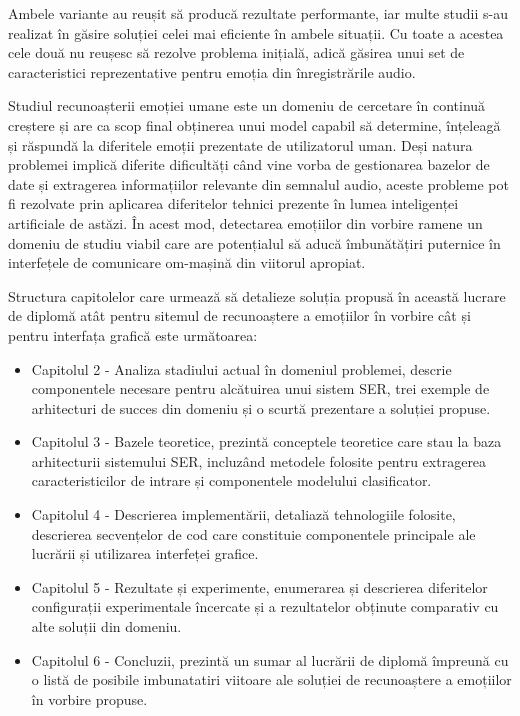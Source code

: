 \documentclass[a4paper,12pt]{book}
\begin{document}
					Ambele variante au reușit să producă rezultate performante, iar multe studii s-au realizat în găsire soluției celei mai eficiente în ambele situații. Cu toate a acestea cele două nu reușesc să rezolve problema inițială, adică găsirea unui set de caracteristici reprezentative pentru emoția din înregistrările audio. \par
					\hfill \par
					Studiul recunoașterii emoției umane este un domeniu de cercetare în continuă creștere și are ca scop final obținerea unui model capabil să determine, înțeleagă și răspundă la diferitele emoții prezentate de utilizatorul uman. Deși natura problemei implică diferite dificultăți când vine vorba de gestionarea bazelor de date și extragerea informațiilor relevante din semnalul audio, aceste probleme pot fi rezolvate prin aplicarea diferitelor tehnici prezente în lumea inteligenței artificiale de astăzi. În acest mod, detectarea emoțiilor din vorbire ramene un domeniu de studiu viabil care are potențialul să aducă îmbunătățiri puternice în interfețele de comunicare om-mașină din viitorul apropiat. \par
					Structura capitolelor care urmează să detalieze soluția propusă în această lucrare de diplomă atât pentru sitemul de recunoaștere a emoțiilor în vorbire cât și pentru interfața grafică este următoarea:
					\begin{itemize}
						\item Capitolul 2 - Analiza stadiului actual în domeniul problemei, descrie componentele necesare pentru alcătuirea unui sistem SER, trei exemple de arhitecturi de succes din domeniu și o scurtă prezentare a soluției propuse.
						\item Capitolul 3 - Bazele teoretice, prezintă conceptele teoretice care stau la baza arhitecturii sistemului SER, incluzând metodele folosite pentru extragerea caracteristicilor de intrare și componentele modelului clasificator. 
						\item Capitolul 4 - Descrierea implementării, detaliază tehnologiile folosite, descrierea secvențelor de cod care constituie componentele principale ale lucrării și utilizarea interfeței grafice.
						\item Capitolul 5 - Rezultate și experimente, enumerarea și descrierea diferitelor configurații experimentale încercate și a rezultatelor obținute comparativ cu alte soluții din domeniu.
						\item Capitolul 6 - Concluzii, prezintă un sumar al lucrării de diplomă împreună cu o listă de posibile imbunatatiri viitoare ale soluției de recunoaștere a emoțiilor în vorbire propuse.
					\end{itemize} 
					
\end{document}
